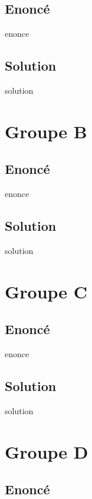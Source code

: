 \documentclass[12pt,A4]{book}
\theoremstyle{definition}
\theoremstyle{thm}
\theoremstyle{def}
\newcounter{sol}[subsection]
\begin{document}
\subsection{Enoncé}

{enonce}

\subsection{Solution}

{solution}


\section{Groupe B}

\subsection{Enoncé}

{enonce}

\subsection{Solution}

{solution}



\section{Groupe C}

\subsection{Enoncé}

{enonce}

\subsection{Solution}

{solution}



\section{Groupe D}

\subsection{Enoncé}
\end{document}
